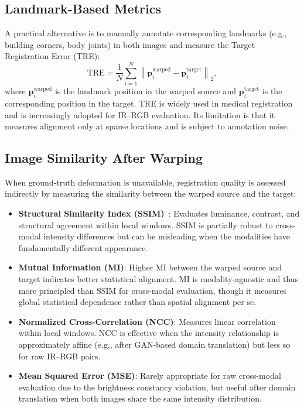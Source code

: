 \subsection{Landmark-Based Metrics}
\label{subsec:landmark}

A practical alternative is to manually annotate corresponding landmarks (e.g.,
building corners, body joints) in both images and measure the Target
Registration Error (TRE):
\begin{equation}
  \mathrm{TRE} = \frac{1}{N} \sum_{i=1}^{N}
    \left\| \mathbf{p}_i^{\mathrm{warped}} - \mathbf{p}_i^{\mathrm{target}}
    \right\|_2,
\end{equation}
where $\mathbf{p}_i^{\mathrm{warped}}$ is the landmark position in the warped
source and $\mathbf{p}_i^{\mathrm{target}}$ is the corresponding position in
the target. TRE is widely used in medical registration and is increasingly
adopted for IR--RGB evaluation. Its limitation is that it measures alignment
only at sparse locations and is subject to annotation noise.

\subsection{Image Similarity After Warping}
\label{subsec:similarity}

When ground-truth deformation is unavailable, registration quality is assessed
indirectly by measuring the similarity between the warped source and the
target:

\begin{itemize}
  \item \textbf{Structural Similarity Index (SSIM)}~\cite{wang2004image}:
    Evaluates luminance, contrast, and structural agreement within local
    windows. SSIM is partially robust to cross-modal intensity differences but
    can be misleading when the modalities have fundamentally different
    appearance.
  \item \textbf{Mutual Information (MI)}: Higher MI between the warped source
    and target indicates better statistical alignment. MI is modality-agnostic
    and thus more principled than SSIM for cross-modal evaluation, though it
    measures global statistical dependence rather than spatial alignment per se.
  \item \textbf{Normalized Cross-Correlation (NCC)}: Measures linear
    correlation within local windows. NCC is effective when the intensity
    relationship is approximately affine (e.g., after GAN-based domain
    translation) but less so for raw IR--RGB pairs.
  \item \textbf{Mean Squared Error (MSE)}: Rarely appropriate for raw
    cross-modal evaluation due to the brightness constancy violation, but
    useful after domain translation when both images share the same intensity
    distribution.
\end{itemize}

